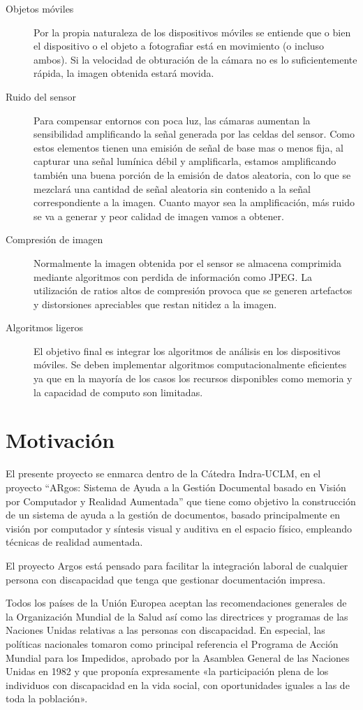 \begin{description}
  \item[Objetos móviles] Por la propia naturaleza de los dispositivos móviles se entiende que o bien el dispositivo o el objeto a fotografiar está en movimiento (o incluso ambos). Si la velocidad de obturación de la cámara no es lo suficientemente rápida, la imagen obtenida estará movida.
  \item[Ruido del sensor] Para compensar entornos con poca luz, las cámaras aumentan la sensibilidad amplificando la señal generada por las celdas del sensor. Como estos elementos tienen una emisión de señal de base mas o menos fija, al capturar una señal lumínica débil y amplificarla, estamos amplificando también una buena porción de la emisión de datos aleatoria, con lo que se mezclará una cantidad de señal aleatoria sin contenido a la señal correspondiente a la imagen. Cuanto mayor sea la amplificación, más ruido se va a generar y peor calidad de imagen vamos a obtener. 
  \item[Compresión de imagen] Normalmente la imagen obtenida por el sensor se almacena comprimida mediante algoritmos con perdida de información como JPEG. La utilización de ratios altos de compresión provoca que se generen artefactos y distorsiones apreciables que restan nitidez a la imagen.
  \item[Algoritmos ligeros] El objetivo final es integrar los algoritmos de análisis en los dispositivos móviles. Se deben implementar algoritmos computacionalmente eficientes ya que en la mayoría de los casos los recursos disponibles como memoria  y la capacidad de computo son limitadas.
  \end{description}

  \section{Motivación}
  El presente proyecto se enmarca dentro de la Cátedra Indra-UCLM, en el proyecto “ARgos: Sistema de Ayuda a la Gestión Documental basado en Visión por Computador y Realidad Aumentada” que tiene como objetivo la construcción de un sistema de ayuda a la gestión de documentos, basado principalmente en visión por computador y síntesis visual y auditiva en el espacio físico, empleando técnicas de realidad aumentada.  
  
  El proyecto Argos está pensado para facilitar la integración laboral de cualquier persona con discapacidad que tenga que gestionar documentación impresa. 
  
  Todos los países de la Unión Europea aceptan las recomendaciones generales de la Organización Mundial de la Salud así como las directrices y programas de las Naciones Unidas relativas a las personas con discapacidad.  En especial, las políticas nacionales tomaron como principal referencia el Programa de Acción Mundial para los Impedidos, aprobado por la Asamblea General de las Naciones Unidas en 1982 y que proponía expresamente «la participación plena de los individuos con discapacidad en la vida social, con oportunidades iguales a las de toda la población». 

